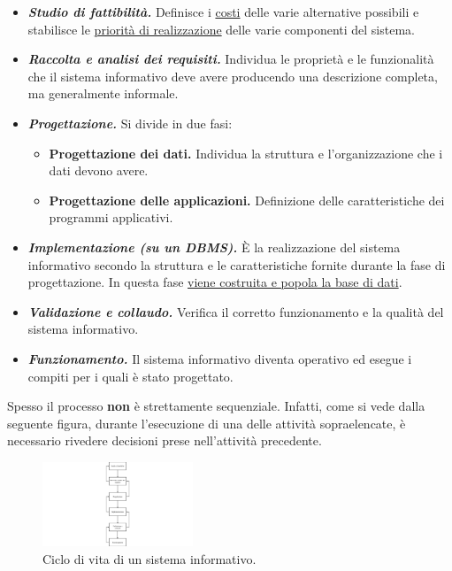 \documentclass[a4paper]{article}
\begin{document}
	\begin{itemize}
		\item[\ding{42}] \textbf{\emph{Studio di fattibilità.}} Definisce i \underline{costi} delle varie alternative possibili e stabilisce le \underline{priorità di realizzazione} delle varie componenti del sistema.
		
		\item[\ding{42}] \textbf{\emph{Raccolta e analisi dei requisiti.}} Individua le proprietà e le funzionalità che il sistema informativo deve avere producendo una descrizione completa, ma generalmente informale.
		
		\item[\ding{42}] \textbf{\emph{Progettazione.}} Si divide in due fasi:
		\begin{itemize}
			\item \textbf{Progettazione dei dati.} Individua la struttura e l'organizzazione che i dati devono avere.
			
			\item \textbf{Progettazione delle applicazioni.} Definizione delle caratteristiche dei programmi applicativi.
		\end{itemize}
		
		\item[\ding{42}] \textbf{\emph{Implementazione (su un DBMS).}} È la realizzazione del sistema informativo secondo la struttura e le caratteristiche fornite durante la fase di progettazione. In questa fase \underline{viene costruita e popola la base di dati}.
		
		\item[\ding{42}] \textbf{\emph{Validazione e collaudo.}} Verifica il corretto funzionamento e la qualità del sistema informativo.
		
		\item[\ding{42}] \textbf{\emph{Funzionamento.}} Il sistema informativo diventa operativo ed esegue i compiti per i quali è stato progettato.
	\end{itemize}

	\noindent
	Spesso il processo \textbf{non} è strettamente sequenziale. Infatti, come si vede dalla seguente figura, durante l'esecuzione di una delle attività sopraelencate, è necessario rivedere decisioni prese nell'attività precedente.
	
	\begin{figure}[!htp]
		\centering
		\includegraphics[width=0.4\textwidth]{img/ciclo_di_vita_sis_inf.pdf}
		\caption{Ciclo di vita di un sistema informativo.}
	\end{figure}
\end{document}
